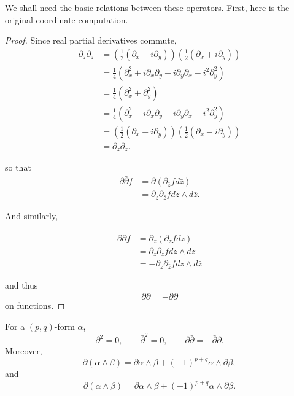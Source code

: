 We shall need the basic relations between
these operators. First, here is the original
coordinate computation.

\begin{proof}
Since real partial derivatives commute,
$$
\begin{aligned}
\partial_z \partial_{\bar{z}}
&=\left(\frac{1}{2}(\partial_x - i
\partial_y)\right)
\left(\frac{1}{2}(\partial_x+i
\partial_y)\right)\\
&=\frac{1}{4}(\partial_x^2
+i \partial_x\partial_y-i\partial_y\partial_x
-i^2 \partial_y^2)\\
&=\frac{1}{4}(\partial_x^2+\partial_y^2)\\
&=\frac{1}{4}(\partial_x^2
-i \partial_x\partial_y+i\partial_y\partial_x
-i^2 \partial_y^2)\\
&=\left(\frac{1}{2}(\partial_x + i
\partial_y)\right)
\left(\frac{1}{2}(\partial_x-i
\partial_y)\right)\\
&=\partial_{\bar{z}}\partial_z.
\end{aligned}
$$

\noindent
so that
$$
\begin{aligned}
\partial \bar\partial f
&=\partial(\partial_{\bar{z}}f d\bar{z})\\
&=\partial_z \partial_{\bar{z}}f dz \wedge
d\bar{z}.
\end{aligned}
$$

\noindent
And similarly,

$$
\begin{aligned}
\bar\partial \partial f
&=\partial_{\bar{z}}(\partial_z f dz)\\
&=\partial_{\bar{z}}\partial_zf d\bar{z}
\wedge dz\\
&=-\partial_z\partial_{\bar{z}}fdz\wedge
d\bar{z}
\end{aligned}
$$

\noindent
and thus
$$
\partial\bar\partial=-\bar\partial \partial
$$
on functions.
\end{proof}

\begin{proposition}
\label{proposition-leibniz-for-del}
For a $(p,q)$-form $\alpha$,
$$
\partial^2=0,
\qquad
\bar\partial^2=0,
\qquad
\partial\bar\partial
=
-\bar\partial\partial.
$$
Moreover,
$$
\partial(\alpha\wedge\beta)
=
\partial\alpha\wedge\beta
+
(-1)^{p+q}
\alpha\wedge\partial\beta,
$$
and
$$
\bar\partial(\alpha\wedge\beta)
=
\bar\partial\alpha\wedge\beta
+
(-1)^{p+q}
\alpha\wedge\bar\partial\beta.
$$
\end{proposition}

